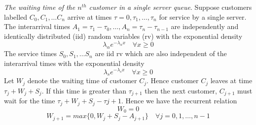 \documentclass[12pt]{exam}
\begin{document}
\begin{questions}
\addpoints


\question[11] \textit{The waiting time of the $n^{th}$ customer in a single server queue}. Suppose customers labelled $C_0, C_1, \dots C_n$ arrive at times $\tau = 0, \tau_1, \dots , \tau_n $ for service by a single server. The interarrival times $A_1 = \tau_1 - \tau_0, \dots, A_n = \tau_n - \tau_{n-1}$ are independently and identically distributed (iid) random variables (rv) with the exponential density
\begin{equation}
    \lambda_\alpha e^{-\lambda_\alpha x} \quad \forall x \geq 0
\end{equation}
The service times $S_0, S_1, \dots S_n$ are iid rv which are also independent of the interarrival times with the exponential density
\begin{equation}
    \lambda_s e^{-\lambda_s x} \quad \forall x \geq 0
\end{equation}
Let $W_j$ denote the waiting time of customer $C_j$. Hence customer $C_j$ leaves at time $\tau_j + W_j + S_j$. If this time is greater than $\tau_{j+1}$ then the next customer, $C_{j+1}$ must wait for the time $\tau_j + W_j + S_j - \tau{j+1}$. Hence we have the recurrent relation
\begin{equation}
    W_0 = 0
    \end{equation}
    \begin{equation}
    W_{j+1} = max \{0, W_j + S_j -A_{j+1}\} \quad \forall j = 0,1, \dots,n-1
\end{equation}
\noaddpoints %
\begin{parts}

\end{parts}
\end{questions}
\end{document}
